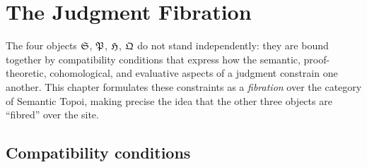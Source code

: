 \chapter{The Judgment Fibration}
\label{ch:fibration}

The four objects $\mathfrak{S}$, $\mathfrak{P}$, $\mathfrak{H}$, $\mathfrak{Q}$ do not stand
independently: they are bound together by compatibility conditions that
express how the semantic, proof-theoretic, cohomological, and
evaluative aspects of a judgment constrain one another.  This chapter
formulates these constraints as a \emph{fibration} over the category
of Semantic Topoi, making precise the idea that the other three objects
are ``fibred'' over the site.

\section{Compatibility conditions}
\label{sec:compatibility}


